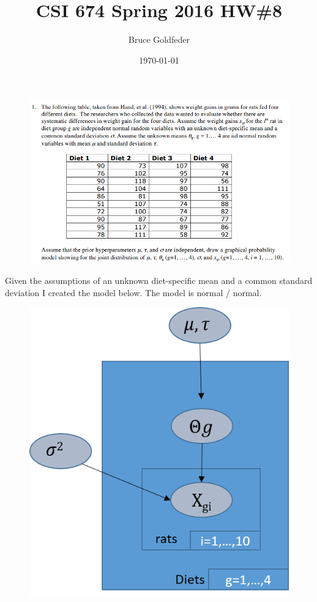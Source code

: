 \documentclass[12pt]{article}
\title{CSI 674 Spring 2016 HW\#8}
\author{Bruce Goldfeder}
\date{\today}
\newcommand{\squeezeup}{\vspace{-5mm}}
\begin{document}
\maketitle
{}

\begin{figure}[H]
\begin{flushleft}
\includegraphics[scale=.9]{HW8Q1.png}
\end{flushleft}
\end{figure}
\squeezeup
\squeezeup
\squeezeup

\hspace{1cm} Given the assumptions of an unknown diet-specific mean and a common standard deviation I created the model below.  The model is normal / normal.


\begin{figure}[H]
\begin{flushleft}
\includegraphics[scale=.9]{hierarchicalQ1d.png}
\end{flushleft}
\end{figure}
\end{document}
